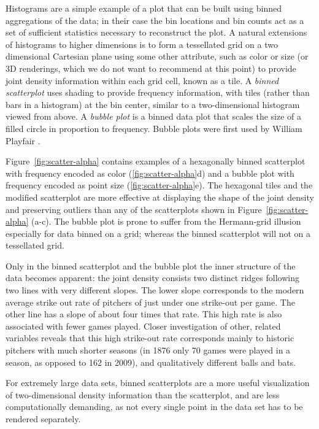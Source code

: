 Histograms are a simple example of a plot that can be built using binned aggregations of the data; in their case the bin locations and bin counts act as a set of sufficient statistics necessary to reconstruct the plot.  A natural extensions of histograms to higher dimensions is to form a tessellated grid on a two dimensional Cartesian plane using some other attribute, such as color or size (or 3D renderings, which we do not want to recommend at this point) to provide joint density information within each grid cell, known as a tile.  A {\it binned scatterplot} uses shading to provide frequency information, with tiles (rather than bars in a histogram) at the bin center, similar to a two-dimensional histogram viewed from above. A \textit{bubble plot} is a binned data plot that scales the size of a filled circle in proportion to frequency.  Bubble plots were first used by William Playfair \citep{playfair, playfair2}. 

Figure~\ref{fig:scatter-alpha} contains examples of a hexagonally binned scatterplot with frequency encoded as color (\ref{fig:scatter-alpha}d) and a bubble plot with frequency encoded as point size (\ref{fig:scatter-alpha}e). The hexagonal tiles and the modified scatterplot are more effective at displaying the shape of the joint density and preserving outliers than any of the scatterplots shown in Figure~\ref{fig:scatter-alpha} (a-c). The bubble plot is prone to suffer from the Hermann-grid illusion \citep{hermann:1870} especially for data binned on a grid; whereas the binned scatterplot will not on a tessellated grid. 

Only in the binned scatterplot and the bubble plot the inner structure of the data becomes apparent: the joint density consists two distinct ridges following two lines with very different slopes. The lower slope corresponds to the modern average strike out rate of pitchers of just under one strike-out per game. The other line has a slope of about four times that rate. This high rate is also associated with fewer games played. Closer investigation of other, related variables reveals that this high strike-out rate corresponds mainly to historic pitchers with much shorter seasons (in 1876 only 70 games were played in a season, as opposed to 162 in 2009), and qualitatively different balls and  bats.

For extremely large data sets, binned scatterplots are a more useful visualization of two-dimensional density information than the scatterplot, and are less computationally demanding, as not every single point in the data set has to be rendered separately. 

